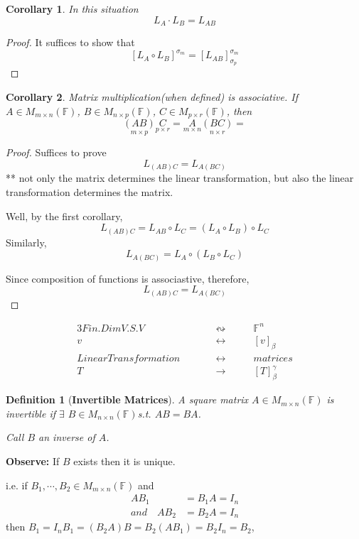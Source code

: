 \documentclass[12pt]{article}
\theoremstyle{plain}
\newtheorem{definition}{Definition}[subsection]
\newtheorem{corollary}{Corollary}[subsection]
\newcommand{\mF}{{\mathbb{F}}}
\begin{document}
	\begin{corollary}
		In this situation
		\[
			L_A \cdot L_B = L_{AB}
		\]
	\end{corollary}
	\begin{proof}
		It suffices to show that 
		\[
			[L_A \circ L_B]^{\sigma_m} = [L_{AB}]_{\sigma_p}^{\sigma_m}
		\]
	\end{proof}

	\begin{corollary}
		Matrix multiplication(when defined) is associative. 
		If $A\in M_{m\times n}(\mF)$, $B \in M_{n\times p}(\mF)$, 
		$C \in M_{p\times r}(\mF)$, then 
		\[
			\underset{m\times p}{(AB)}\underset{p\times r}{C} = 
			\underset{m\times n}{A}\underset{n\times r}{(BC)} = 
		\]
	\end{corollary}
	\begin{proof}
		Suffices to prove
		\[
			L_{(AB)C} = L_{A(BC)}
		\]
		** not only the matrix determines the linear transformation, but also
		the linear transformation determines the matrix.

		Well, by the first corollary,  
		\[
			L_{(AB)C}  = L_{AB} \circ L_C = (L_A\circ L_B) \circ L_C
		\]
		Similarly, 
		\[
			L_{A(BC)} = L_A\circ (L_B \circ L_C)
		\]

		Since composition of functions is associastive, therefore,
		\[
			L_{(AB)C} = L_{A(BC)}
		\]
	\end{proof}

	\begin{alignat*}{3}
		Fin. Dim V.S. V & &\qquad \leftrightsquigarrow \qquad & \mF^n\\
		 v & & \qquad \leftrightarrow \qquad & [v]_{\beta}\\
		 Linear Transformation & & \qquad \leftrightarrow \qquad & matrices\\
		 T & &\qquad \longrightarrow \qquad & [T]_{\beta}^{\gamma}
	\end{alignat*}



	\begin{definition}[\textbf{Invertible Matrices}]
		A square matrix $A \in M_{m\times n}(\mF)$ is invertible if $\exists$
		$B \in M_{n\times n}(\mF)$s.t. $AB=BA$.

		Call $B$ an inverse of $A$.
	\end{definition}
	\textbf{Observe: } If $B$ exists then it is unique. 

	i.e. if $B_1,\cdots, B_2 \in M_{m\times n}(\mF)$ and 
	\begin{align*}
		AB_1 &= B_1A = I_n\\
		and \quad AB_2 &= B_2A = I_n
	\end{align*}
	then $B_1 = I_nB_1 = (B_2A)B = B_2(AB_1) = B_2I_n = B_2$,
	
\end{document}
